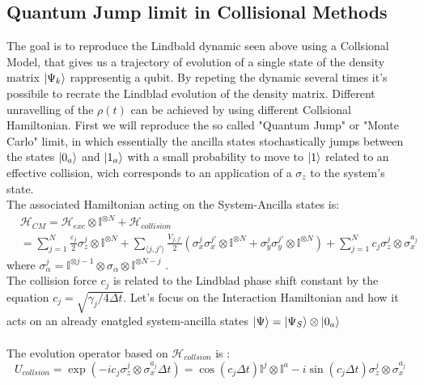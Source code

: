 \documentclass[a4paper,12pt]{article}
\begin{document}
	\subsection{Quantum Jump limit in Collisional Methods}
	The goal is to reproduce the Lindbald dynamic seen above using a Collsional Model, that gives us a trajectory of evolution of a single state of the density matrix $ \ket{\Psi_k} $ rappresentig a qubit. By repeting the dynamic several times it's possibile to recrate the Lindblad evolution of the density matrix.
	Different unravelling of the $ \rho (t) $ can be achieved by using different Collsional Hamiltonian. First we will reproduce the so called "Quantum Jump" or "Monte Carlo" limit, in which essentially the ancilla states stochastically jumps between the states $ \ket{0_a} $ and $ \ket{1_a} $ with a small probability to move to $ \ket{1} $ related to an effective collision, wich corresponds to an application of a $ \sigma_{z} $ to the system's state. \\
	The associated Hamiltonian acting on the System-Ancilla states is:
	\begin{align}
		&\mathcal{H}_{CM} = \mathcal{H}_{exc} \otimes \mathbb{I}^{\otimes N} + \mathcal{H}_{collision} \\
		&= \sum_{j=1}^{N} {\frac{\varepsilon_j}{2} \sigma_{z}^{j} \otimes \mathbb{I}^{\otimes N} } + \sum_{\langle j,j' \rangle} {\frac{V_{j,j'}}{2} \left( \sigma_{x}^{j}\sigma_{x}^{j'} \otimes \mathbb{I}^{\otimes N} + \sigma_{y}^{j}\sigma_{y}^{j'} \otimes \mathbb{I}^{\otimes N} \right)} + \sum_{j=1}^{N}{c_j \sigma_{z}^{j} \otimes \sigma_{x}^{a_j}}
	\end{align}
	where $ \sigma_{\alpha}^j = \mathbb{I}^{\otimes j-1} \otimes \sigma_{\alpha} \otimes \mathbb{I}^{\otimes N-j}  $ . \\
	The collision force $ c_j $ is related to the Lindblad phase shift constant by the equation $ c_j = \sqrt{\gamma_j / 4 \Delta t} $. 
	Let's focus on the Interaction Hamiltonian and how it acts on an already enatgled system-ancilla states $ \ket{\Psi} = \ket{\Psi_S} \otimes \ket{0_a} $ \\
	\\
	The evolution operator based on $ \mathcal{H}_{collsion} $ is :
	\begin{equation}
		U_{collsion} = \exp \left(-i c_j \sigma_{z}^{j} \otimes \sigma_{x}^{a_j} \Delta t\right) = \cos \left(c_j \Delta t \right) \mathbb{I}^j \otimes \mathbb{I}^a - i \sin \left(c_j \Delta t \right) \sigma_{z}^{j} \otimes \sigma_{x}^{a_j}
	\end{equation}
\end{document}
